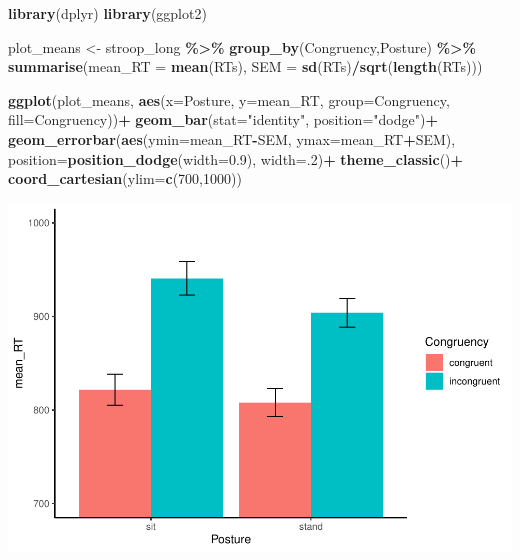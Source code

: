 \documentclass[
]{book}
\newenvironment{Shaded}{\begin{snugshade}}{\end{snugshade}}
\newcommand{\AttributeTok}[1]{\textcolor[rgb]{0.13,0.29,0.53}{#1}}
\newcommand{\DecValTok}[1]{\textcolor[rgb]{0.00,0.00,0.81}{#1}}
\newcommand{\FloatTok}[1]{\textcolor[rgb]{0.00,0.00,0.81}{#1}}
\newcommand{\FunctionTok}[1]{\textcolor[rgb]{0.13,0.29,0.53}{\textbf{#1}}}
\newcommand{\NormalTok}[1]{#1}
\newcommand{\OtherTok}[1]{\textcolor[rgb]{0.56,0.35,0.01}{#1}}
\newcommand{\SpecialCharTok}[1]{\textcolor[rgb]{0.81,0.36,0.00}{\textbf{#1}}}
\newcommand{\StringTok}[1]{\textcolor[rgb]{0.31,0.60,0.02}{#1}}
\begin{document}
\begin{Shaded}
\begin{Highlighting}[]
\FunctionTok{library}\NormalTok{(dplyr)}
\FunctionTok{library}\NormalTok{(ggplot2)}

\NormalTok{plot\_means }\OtherTok{\textless{}{-}}\NormalTok{ stroop\_long }\SpecialCharTok{\%\textgreater{}\%}
            \FunctionTok{group\_by}\NormalTok{(Congruency,Posture) }\SpecialCharTok{\%\textgreater{}\%}
            \FunctionTok{summarise}\NormalTok{(}\AttributeTok{mean\_RT =} \FunctionTok{mean}\NormalTok{(RTs),}
                      \AttributeTok{SEM =} \FunctionTok{sd}\NormalTok{(RTs)}\SpecialCharTok{/}\FunctionTok{sqrt}\NormalTok{(}\FunctionTok{length}\NormalTok{(RTs)))}

\FunctionTok{ggplot}\NormalTok{(plot\_means, }\FunctionTok{aes}\NormalTok{(}\AttributeTok{x=}\NormalTok{Posture, }\AttributeTok{y=}\NormalTok{mean\_RT, }\AttributeTok{group=}\NormalTok{Congruency, }\AttributeTok{fill=}\NormalTok{Congruency))}\SpecialCharTok{+}
  \FunctionTok{geom\_bar}\NormalTok{(}\AttributeTok{stat=}\StringTok{"identity"}\NormalTok{, }\AttributeTok{position=}\StringTok{"dodge"}\NormalTok{)}\SpecialCharTok{+}
  \FunctionTok{geom\_errorbar}\NormalTok{(}\FunctionTok{aes}\NormalTok{(}\AttributeTok{ymin=}\NormalTok{mean\_RT}\SpecialCharTok{{-}}\NormalTok{SEM, }\AttributeTok{ymax=}\NormalTok{mean\_RT}\SpecialCharTok{+}\NormalTok{SEM), }
                \AttributeTok{position=}\FunctionTok{position\_dodge}\NormalTok{(}\AttributeTok{width=}\FloatTok{0.9}\NormalTok{),}
                \AttributeTok{width=}\NormalTok{.}\DecValTok{2}\NormalTok{)}\SpecialCharTok{+}
  \FunctionTok{theme\_classic}\NormalTok{()}\SpecialCharTok{+}
  \FunctionTok{coord\_cartesian}\NormalTok{(}\AttributeTok{ylim=}\FunctionTok{c}\NormalTok{(}\DecValTok{700}\NormalTok{,}\DecValTok{1000}\NormalTok{))}
\end{Highlighting}
\end{Shaded}

\includegraphics{Statistics_Lab_files/figure-latex/unnamed-chunk-556-1.pdf}
\end{document}

